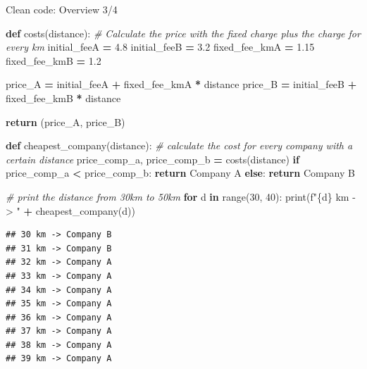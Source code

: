 \documentclass[
  8pt,
  ignorenonframetext,
]{beamer}
\newenvironment{Shaded}{\begin{snugshade}}{\end{snugshade}}
\newcommand{\BuiltInTok}[1]{#1}
\newcommand{\CommentTok}[1]{\textcolor[rgb]{0.56,0.35,0.01}{\textit{#1}}}
\newcommand{\ControlFlowTok}[1]{\textcolor[rgb]{0.13,0.29,0.53}{\textbf{#1}}}
\newcommand{\DecValTok}[1]{\textcolor[rgb]{0.00,0.00,0.81}{#1}}
\newcommand{\FloatTok}[1]{\textcolor[rgb]{0.00,0.00,0.81}{#1}}
\newcommand{\KeywordTok}[1]{\textcolor[rgb]{0.13,0.29,0.53}{\textbf{#1}}}
\newcommand{\NormalTok}[1]{#1}
\newcommand{\OperatorTok}[1]{\textcolor[rgb]{0.81,0.36,0.00}{\textbf{#1}}}
\newcommand{\SpecialCharTok}[1]{\textcolor[rgb]{0.00,0.00,0.00}{#1}}
\newcommand{\SpecialStringTok}[1]{\textcolor[rgb]{0.31,0.60,0.02}{#1}}
\newcommand{\StringTok}[1]{\textcolor[rgb]{0.31,0.60,0.02}{#1}}
\begin{document}
\begin{frame}[fragile]{Clean code: Overview 3/4}
\protect\hypertarget{clean-code-overview-34}{}
\begin{Shaded}
\begin{Highlighting}[]
\KeywordTok{def}\NormalTok{ costs(distance):}
    \CommentTok{\# Calculate the price with the fixed charge plus the charge for every km}
\NormalTok{    initial\_feeA }\OperatorTok{=} \FloatTok{4.8}
\NormalTok{    initial\_feeB }\OperatorTok{=} \FloatTok{3.2}
\NormalTok{    fixed\_fee\_kmA }\OperatorTok{=} \FloatTok{1.15}
\NormalTok{    fixed\_fee\_kmB }\OperatorTok{=} \FloatTok{1.2}
    
\NormalTok{    price\_A }\OperatorTok{=}\NormalTok{ initial\_feeA }\OperatorTok{+}\NormalTok{ fixed\_fee\_kmA }\OperatorTok{*}\NormalTok{ distance}
\NormalTok{    price\_B }\OperatorTok{=}\NormalTok{ initial\_feeB }\OperatorTok{+}\NormalTok{ fixed\_fee\_kmB }\OperatorTok{*}\NormalTok{ distance}
    
    \ControlFlowTok{return}\NormalTok{ (price\_A, price\_B)}

\KeywordTok{def}\NormalTok{ cheapest\_company(distance):}
    \CommentTok{\# calculate the cost for every company with a certain distance}
\NormalTok{    price\_comp\_a, price\_comp\_b }\OperatorTok{=}\NormalTok{ costs(distance)}
    \ControlFlowTok{if}\NormalTok{ price\_comp\_a }\OperatorTok{\textless{}}\NormalTok{ price\_comp\_b:}
        \ControlFlowTok{return} \StringTok{\textquotesingle{}Company A\textquotesingle{}}
    \ControlFlowTok{else}\NormalTok{:}
        \ControlFlowTok{return} \StringTok{\textquotesingle{}Company B\textquotesingle{}}

\CommentTok{\# print the distance from 30km to 50km}
\ControlFlowTok{for}\NormalTok{ d }\KeywordTok{in} \BuiltInTok{range}\NormalTok{(}\DecValTok{30}\NormalTok{, }\DecValTok{40}\NormalTok{):}
    \BuiltInTok{print}\NormalTok{(}\SpecialStringTok{f"}\SpecialCharTok{\{}\NormalTok{d}\SpecialCharTok{\}}\SpecialStringTok{ km {-}\textgreater{} "} \OperatorTok{+}\NormalTok{ cheapest\_company(d))}
\end{Highlighting}
\end{Shaded}

\begin{verbatim}
## 30 km -> Company B
## 31 km -> Company B
## 32 km -> Company A
## 33 km -> Company A
## 34 km -> Company A
## 35 km -> Company A
## 36 km -> Company A
## 37 km -> Company A
## 38 km -> Company A
## 39 km -> Company A
\end{verbatim}
\end{frame}
\end{document}
